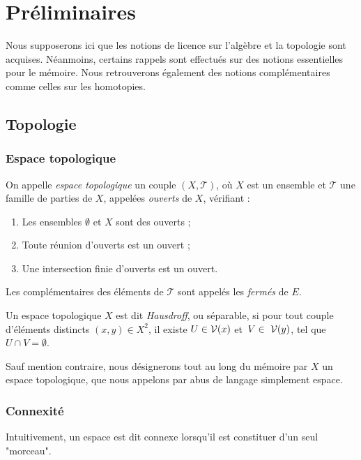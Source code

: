 \section{Préliminaires}

Nous supposerons ici que les notions de licence sur l'algèbre et la topologie sont acquises. Néanmoins, certains rappels sont effectués sur des notions essentielles pour le mémoire. Nous retrouverons également des notions complémentaires comme celles sur les homotopies.

\subsection{Topologie}
\subsubsection{Espace topologique}

\begin{definition}
On appelle \emph{espace topologique} un couple $(X,\mathcal{T})$, où $X$ est un ensemble et $\mathcal{T}$ une famille de parties de $X$, appelées \emph{ouverts} de $X$, vérifiant : \begin{enumerate}
    \item Les ensembles $\emptyset$ et $X$ sont des ouverts ;
    \item Toute réunion d'ouverts est un ouvert ;
    \item Une intersection finie d'ouverts est un ouvert.
\end{enumerate}
Les complémentaires des éléments de $\mathcal{T}$ sont appelés les \emph{fermés} de $E$.
\end{definition}

\begin{definition}
Un espace topologique $X$ est dit \emph{Hausdroff}, ou séparable, si pour tout couple d'éléments distincts $(x,y)\in X^2$, il existe $U\in\mathcal{V}(x)$ et~$V\in~\mathcal{V}(y)$, tel que $U\cap V=\emptyset$.
\end{definition}

Sauf mention contraire, nous désignerons tout au long du mémoire par $X$ un espace topologique, que nous appelons par abus de langage simplement espace.

\subsubsection{Connexité}

Intuitivement, un espace est dit connexe lorsqu'il est constituer d'un seul "morceau".

